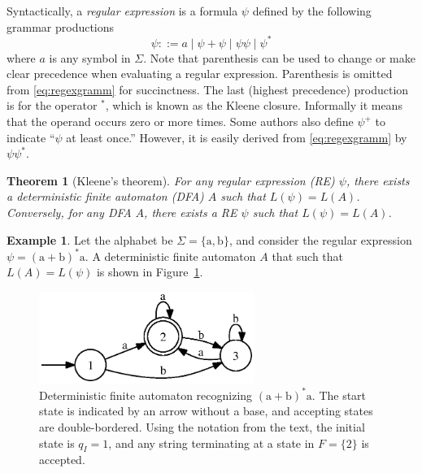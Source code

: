 \documentclass{amsart}
\theoremstyle{plain}
\newtheorem{thm}{Theorem}
\theoremstyle{definition}
\theoremstyle{definition}
\newtheorem{examp}{Example}
\begin{document}
Syntactically, a \textit{regular expression} is a formula $\psi$ defined by the
following grammar productions
\begin{equation}\label{eq:regexgramm}
\psi ::= a \mid \psi+\psi \mid \psi\psi \mid \psi^{*}
\end{equation}
where $a$ is any symbol in $\Sigma$.  Note that parenthesis can be used to
change or make clear precedence when evaluating a regular expression.
Parenthesis is omitted from \eqref{eq:regexgramm} for succinctness.  The last
(highest precedence) production is for the operator $^*$, which is known as the
Kleene closure.  Informally it means that the operand occurs zero or more times.
Some authors also define $\psi^{+}$ to indicate ``$\psi$ at least once.''
However, it is easily derived from \eqref{eq:regexgramm} by $\psi\psi^{*}$.
\begin{thm}[Kleene's theorem]\label{thm:redfa}
For any regular expression (RE) $\psi$, there exists a deterministic finite
automaton (DFA) $A$ such that $L(\psi)=L(A)$.  Conversely, for any DFA $A$,
there exists a RE $\psi$ such that $L(\psi)=L(A)$.
\end{thm}

\begin{examp}
Let the alphabet be $\Sigma=\{\mathrm{a},\mathrm{b}\}$, and consider the regular
expression $\psi = (\mathrm{a}+\mathrm{b})^{*}\mathrm{a}$.  A deterministic
finite automaton $A$ that such that $L(A)=L(\psi)$ is shown in
Figure~\ref{fig:smalldfa}.
\begin{figure}
\centering
\includegraphics[width=7cm]{figures/exampleDFA.eps}
\caption{Deterministic finite automaton recognizing
  $(\mathrm{a}+\mathrm{b})^{*}\mathrm{a}$. The start state is indicated by an
  arrow without a base, and accepting states are double-bordered.  Using the
  notation from the text, the initial state is $q_I = 1$, and any string
  terminating at a state in $F=\{ 2 \}$ is accepted.}
\label{fig:smalldfa}
\end{figure}
\end{examp}
\end{document}
